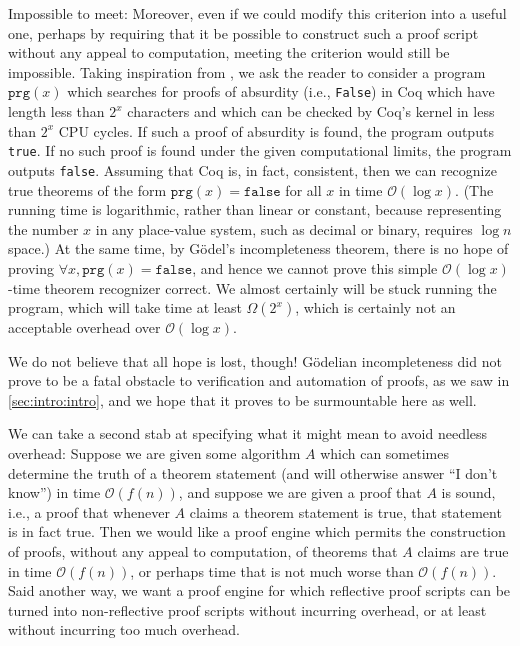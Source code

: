 Impossible to meet:
Moreover, even if we could modify this criterion into a useful one, perhaps by requiring that it be possible to construct such a proof script without any appeal to computation, meeting the criterion would still be impossible.
Taking inspiration from \textcite[pp.~24--25]{Logical2016Garrabrant}, we ask the reader to consider a program $\texttt{prg}(x)$ which searches for proofs of absurdity (i.e., \texttt{False}) in Coq which have length less than $2^x$ characters and which can be checked by Coq's kernel in less than $2^x$ CPU cycles.
If such a proof of absurdity is found, the program outputs \texttt{true}.
If no such proof is found under the given computational limits, the program outputs \texttt{false}.
Assuming that Coq is, in fact, consistent, then we can recognize true theorems of the form $\texttt{prg}(x) = \texttt{false}$ for all $x$ in time $\mathcal O(\log x)$.
(The running time is logarithmic, rather than linear or constant, because representing the number $x$ in any place-value system, such as decimal or binary, requires $\log n$ space.)
At the same time, by Gödel's incompleteness theorem, there is no hope of proving $\forall x, \texttt{prg}(x) = \texttt{false}$, and hence we cannot prove this simple $\mathcal O(\log x)$-time theorem recognizer correct.
We almost certainly will be stuck running the program, which will take time at least $\Omega(2^x)$, which is certainly not an acceptable overhead over $\mathcal O(\log x)$.

We do not believe that all hope is lost, though!
Gödelian incompleteness did not prove to be a fatal obstacle to verification and automation of proofs, as we saw in \autoref{sec:intro:intro}, and we hope that it proves to be surmountable here as well.

We can take a second stab at specifying what it might mean to avoid needless overhead:
Suppose we are given some algorithm $A$ which can sometimes determine the truth of a theorem statement (and will otherwise answer ``I don't know'') in time $\mathcal O(f(n))$, and suppose we are given a proof that $A$ is sound, i.e., a proof that whenever $A$ claims a theorem statement is true, that statement is in fact true.
Then we would like a proof engine which permits the construction of proofs, without any appeal to computation, of theorems that $A$ claims are true in time $\mathcal O(f(n))$, or perhaps time that is not much worse than $\mathcal O(f(n))$.
Said another way, we want a proof engine for which reflective proof scripts can be turned into non-reflective proof scripts without incurring overhead, or at least without incurring too much overhead.

